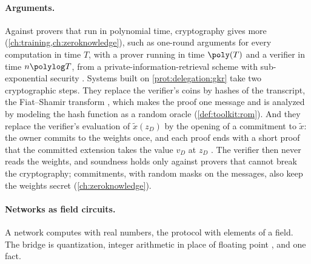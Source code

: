 \begin{refsection}
\paragraph{Arguments.} Against provers that run in polynomial time, cryptography gives more (\cref{ch:training,ch:zeroknowledge}), such as one-round arguments for every computation in time $T$, with a prover running in time $\poly(T)$ and a verifier in time $n\polylog T$, from a private-information-retrieval scheme with sub-exponential security \parencite{KalaiRazRothblum2014}. Systems built on \cref{prot:delegation:gkr} take two cryptographic steps. They replace the verifier's coins by hashes of the transcript, the Fiat--Shamir transform \parencite{FiatShamir1986}, which makes the proof one message and is analyzed by modeling the hash function as a random oracle (\cref{def:toolkit:rom}). And they replace the verifier's evaluation of $\tilde x(z_D)$ by the opening of a commitment to $\tilde x$: the owner commits to the weights once, and each proof ends with a short proof that the committed extension takes the value $v_D$ at $z_D$ \parencite{WahbyEtAl2018,SunLiZhang2024}. The verifier then never reads the weights, and soundness holds only against provers that cannot break the cryptography; commitments, with random masks on the messages, also keep the weights secret (\cref{ch:zeroknowledge}).

\paragraph{Networks as field circuits.} A network computes with real numbers, the protocol with elements of a field. The bridge is quantization, integer arithmetic in place of floating point \parencite{JacobEtAl2018}, and one fact.



\end{refsection}
